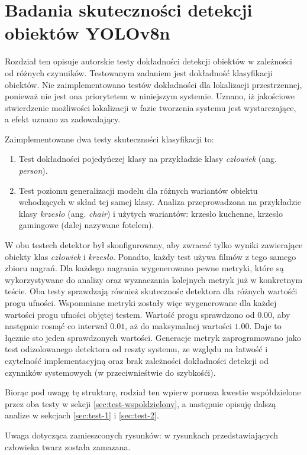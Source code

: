 \chapter{Badania skuteczności detekcji obiektów YOLOv8n}
Rozdział ten opisuje autorskie testy dokładności detekcji obiektów w zależności od różnych czynników. Testowanym zadaniem jest dokładność klasyfikacji obiektów. Nie zaimplementowano testów dokładności dla lokalizacji przestrzennej, ponieważ nie jest ona priorytetem w niniejszym systemie. Uznano, iż jakościowe stwierdzenie możliwości lokalizacji w fazie tworzenia systemu jest wystarczające, a efekt uznano za zadowalający. 

Zaimplementowane dwa testy skuteczności klasyfikacji to:
\begin{enumerate}
    \item Test dokładności pojedyńczej klasy na przykładzie klasy \emph{człowiek} (ang. \emph{person}). 
    \item  Test poziomu generalizacji modelu dla różnych wariantów obiektu wchodzących w skład tej samej klasy. Analiza przeprowadzona na przykładzie klasy \emph{krzesło} (ang. \emph{chair}) i użytych wariantów: krzesło kuchenne, krzesło gamingowe (dalej nazywane fotelem). 
\end{enumerate}
W obu testech detektor był skonfigurowany, aby zwracać tylko wyniki zawierające obiekty klas \emph{człowiek} i \emph{krzesło}. Ponadto, każdy test używa filmów z tego samego zbioru nagrań. Dla każdego nagrania wygenerowano pewne metryki, które są wykorzystywane do analizy oraz wyznaczania kolejnych metryk już w konkretnym teście. Oba testy sprawdzają również skutecznośc detektora dla różnych wartośći progu ufności. Wspomniane metryki zostały więc wygenerowane dla każdej wartości progu ufności objętej testem. Wartość progu sprawdzono od $0.00$, aby następnie rosnąć co interwał $0.01$, aż do maksymalnej wartości $1.00$. Daje to łącznie sto jeden sprawdzonych wartości. Generacje metryk zaprogramowano jako test odizolowanego detektora od reszty systemu, ze względu na łatwość i czytelność implementacyjną oraz brak zależności dokładności detekcji od czynników systemowych (w przeciwnieśtwie do szybkośći).  

Biorąc pod uwagę tę strukturę, rodział ten wpierw porusza kwestie współdzielone przez oba testy w sekcji \ref{sec:test-wspoldzielony}, a następnie opisuję dalszą analize w sekcjach \ref{sec:test-1} i \ref{sec:test-2}.
 
Uwaga dotycząca zamieszconych rysunków: w rysunkach przedstawiających człowieka twarz została zamazana.


